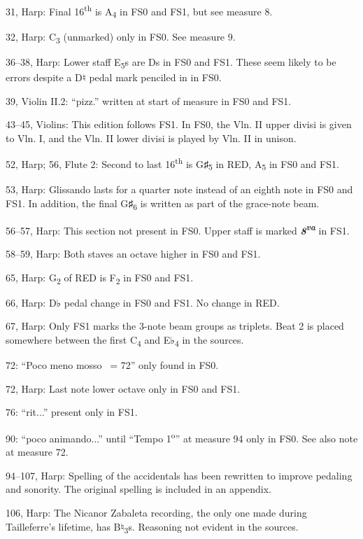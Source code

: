 \documentclass[twoside]{article}
\begin{document}
\begin{hangparas}{15pt}{1}
\begin{multicols}{2}
31, Harp: Final 16\textsuperscript{th} is A\textsubscript{4} in FS0 and FS1, but see measure 8.

32, Harp: C\textsubscript{3} (unmarked) only in FS0. See measure 9.

36--38, Harp: Lower staff E\textsubscript{5}s are Ds in FS0 and FS1. These seem likely to be errors despite a D♮ pedal mark penciled in in FS0.

39, Violin II.2: ``pizz.'' written at start of measure in FS0 and FS1.

43--45, Violins: This edition follows FS1. In FS0, the Vln. II upper divisi is given to Vln. I, and the Vln. II lower divisi is played by Vln. II in unison.

52, Harp; 56, Flute 2: Second to last 16\textsuperscript{th} is G♯\textsubscript{5} in RED, A\textsubscript{5} in FS0 and FS1.

53, Harp: Glissando lasts for a quarter note instead of an eighth note in FS0 and FS1. In addition, the final G♯\textsubscript{6} is written as part of the grace-note beam.

56--57, Harp: This section not present in FS0. Upper staff is marked \textit{\textbf{8\textsuperscript{va}}} in FS1.

58--59, Harp: Both staves an octave higher in FS0 and FS1.

65, Harp: G\textsubscript{2} of RED is F\textsubscript{2} in FS0 and FS1.

66, Harp: D♭ pedal change in FS0 and FS1. No change in RED.

67, Harp: Only FS1 marks the 3-note beam groups as triplets. Beat 2 is placed somewhere between the first C\textsubscript{4} and E♭\textsubscript{4} in the sources.

72: ``Poco meno mosso \quarternote\ = 72'' only found in FS0.

72, Harp: Last note lower octave only in FS0 and FS1.

76: ``rit...'' present only in FS1.

90: ``poco animando...'' until ``Tempo 1\textsuperscript{o}'' at measure 94 only in FS0. See also note at measure 72.

94--107, Harp: Spelling of the accidentals has been rewritten to improve pedaling and sonority. The original spelling is included in an appendix.

106, Harp: The Nicanor Zabaleta recording, the only one made during Tailleferre's lifetime, has B♮\textsubscript{3}s. Reasoning not evident in the sources.


\end{multicols}
\end{hangparas}
\end{document}
